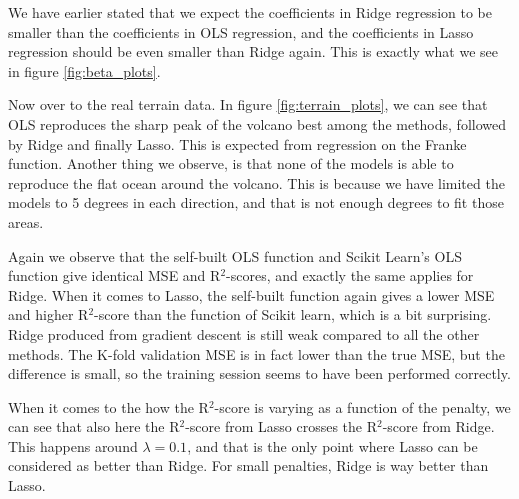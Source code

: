 We have earlier stated that we expect the coefficients in Ridge regression to be smaller than the coefficients in OLS regression, and the coefficients in Lasso regression should be even smaller than Ridge again. This is exactly what we see in figure \eqref{fig:beta_plots}.
\vspace{1cm}

Now over to the real terrain data. In figure \eqref{fig:terrain_plots}, we can see that OLS reproduces the sharp peak of the volcano best among the methods, followed by Ridge and finally Lasso. This is expected from regression on the Franke function. Another thing we observe, is that none of the models is able to reproduce the flat ocean around the volcano. This is because we have limited the models to 5 degrees in each direction, and that is not enough degrees to fit those areas. 

Again we observe that the self-built OLS function and Scikit Learn's OLS function give identical MSE and R$^2$-scores, and exactly the same applies for Ridge. When it comes to Lasso, the self-built function again gives a lower MSE and higher R$^2$-score than the function of Scikit learn, which is a bit surprising. Ridge produced from gradient descent is still weak compared to all the other methods. The K-fold validation MSE is in fact lower than the true MSE, but the difference is small, so the training session seems to have been performed correctly. 

When it comes to the how the R$^2$-score is varying as a function of the penalty, we can see that also here the R$^2$-score from Lasso crosses the R$^2$-score from Ridge. This happens around $\lambda=0.1$, and that is the only point where Lasso can be considered as better than Ridge. For small penalties, Ridge is way better than Lasso.